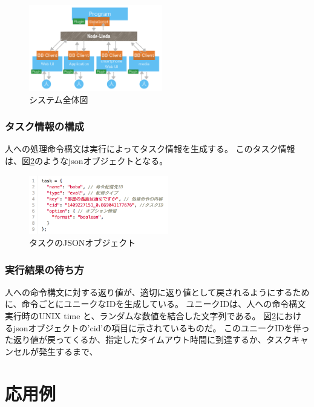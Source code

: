 \begin{figure}[h]
  \includegraphics[width=220px]{./images/system.png}
  \caption{システム全体図}  
  \label{system}
\end{figure}

\subsubsection{タスク情報の構成}\label{ux30bfux30b9ux30afux60c5ux5831ux306eux69cbux6210}

人への処理命令構文は実行によってタスク情報を生成する。
このタスク情報は、図\ref{task}のようなjsonオブジェクトとなる。

\begin{figure}[h]
  \includegraphics[width=230px]{./images/task.png}
  \caption{タスクのJSONオブジェクト}  
  \label{task}
\end{figure}

\subsubsection{実行結果の待ち方}\label{ux5b9fux884cux7d50ux679cux306eux5f85ux3061ux65b9}

人への命令構文に対する返り値が、適切に返り値として戻されるようにするために、命令ごとにユニークなIDを生成している。
ユニークIDは、人への命令構文実行時のUNIX time
と、ランダムな数値を結合した文字列である。
図\ref{task}におけるjsonオブジェクトの'cid'の項目に示されているものだ。
このユニークIDを伴った返り値が戻ってくるか、指定したタイムアウト時間に到達するか、タスクキャンセルが発生するまで、

\section{応用例}\label{ux5fdcux7528ux4f8b}

